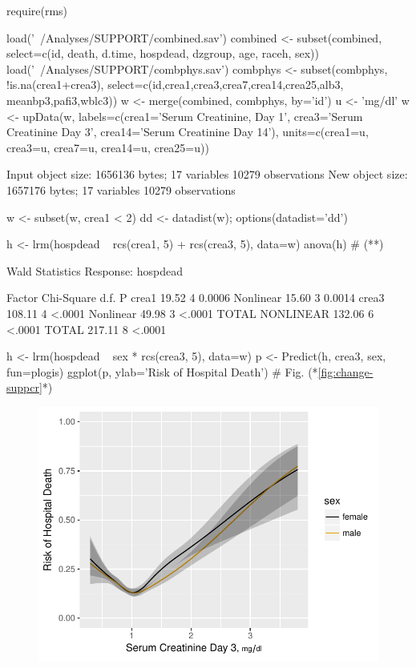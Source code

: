 \begin{Schunk}
\begin{Sinput}
require(rms)
\end{Sinput}
\begin{Sinput}
load('~/Analyses/SUPPORT/combined.sav')
combined <- subset(combined,
  select=c(id, death, d.time, hospdead, dzgroup, age, raceh, sex))
load('~/Analyses/SUPPORT/combphys.sav')
combphys <- subset(combphys, !is.na(crea1+crea3),
                   select=c(id,crea1,crea3,crea7,crea14,crea25,alb3,
                     meanbp3,pafi3,wblc3))
w <- merge(combined, combphys, by='id')
u <- 'mg/dl'
w <- upData(w, labels=c(crea1='Serum Creatinine, Day 1',
                 crea3='Serum Creatinine Day 3',
                 crea14='Serum Creatinine Day 14'),
            units=c(crea1=u, crea3=u, crea7=u, crea14=u, crea25=u))
\end{Sinput}
\begin{Soutput}
Input object size:	 1656136 bytes;	 17 variables	 10279 observations
New object size:	1657176 bytes;	17 variables	10279 observations
\end{Soutput}
\begin{Sinput}
w <- subset(w, crea1 < 2)
dd <- datadist(w); options(datadist='dd')

h <- lrm(hospdead ~ rcs(crea1, 5) + rcs(crea3, 5), data=w)
anova(h)   # (*\label{pg:change-anova}*)
\end{Sinput}
\begin{Soutput}
                Wald Statistics          Response: hospdead 

 Factor          Chi-Square d.f. P     
 crea1            19.52     4    0.0006
  Nonlinear       15.60     3    0.0014
 crea3           108.11     4    <.0001
  Nonlinear       49.98     3    <.0001
 TOTAL NONLINEAR 132.06     6    <.0001
 TOTAL           217.11     8    <.0001
\end{Soutput}
\begin{Sinput}
h <- lrm(hospdead ~ sex * rcs(crea3, 5), data=w)
p <- Predict(h, crea3, sex, fun=plogis)
ggplot(p, ylab='Risk of Hospital Death')    # Fig. (*\ref{fig:change-suppcr}*)
\end{Sinput}
\begin{figure}[htbp]

\centerline{\includegraphics{change-suppcr-1} }


\end{figure}
\end{Schunk}

